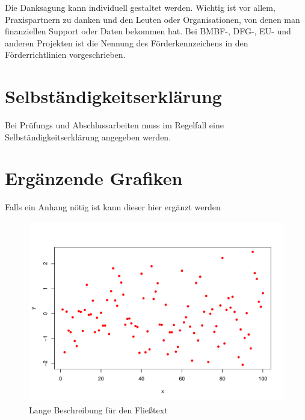 \documentclass[ngerman,11pt,a4paper]{article}
\begin{document}
Die Danksagung kann individuell gestaltet werden. Wichtig ist vor allem,
Praxispartnern zu danken und den Leuten oder Organisationen, von denen man
finanziellen Support oder Daten bekommen hat. Bei BMBF-, DFG-, EU- und anderen
Projekten ist die Nennung des Förderkennzeichens in den Förderrichtlinien
vorgeschrieben.

\section*{Selbständigkeitserklärung}

Bei Prüfungs und Abschlussarbeiten muss im Regelfall eine Selbständigkeitserklärung angegeben werden.


\printbibliography


\setcounter{section}{0}
\renewcommand\thesection{\Alph{section}}
\section{Ergänzende Grafiken}

Falls ein Anhang nötig ist kann dieser hier ergänzt werden

\begin{figure}[h]
	\includegraphics[width=\linewidth]{pdf-plot.pdf}
	\caption[kurze Beschreibung für die Liste der Abbildungen]{Lange Beschreibung für den Fließtext}
\end{figure}
\end{document}
